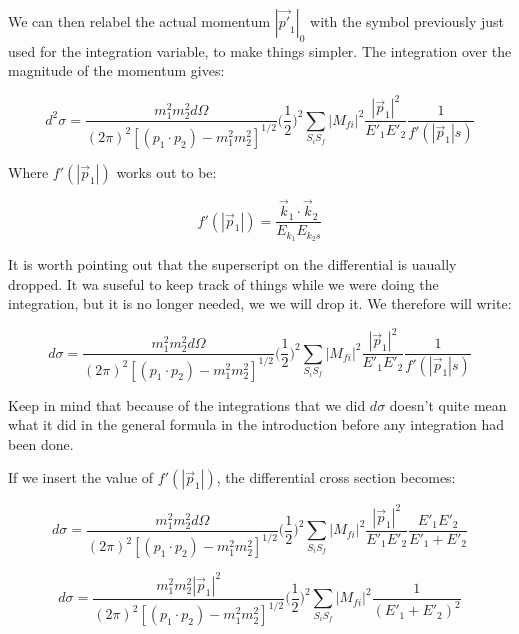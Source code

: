 \documentclass[a4]{article}
\begin{document}
    We can then relabel the actual momentum $|\vec{p'}_1|_0$ with the symbol previously just used for the integration variable, to make things simpler. The integration over the magnitude of the momentum gives: 

    \begin{equation}
        d^2 \sigma = \frac{m_1^2 m_2^2 d \Omega}{(2 \pi)^2 [(p_1 \cdot p_2) - m_1^2 m_2^2]^{1/2}} \bigg( \frac{1}{2} \bigg)^2 \sum_{S_i S_f} |M_{fi}|^2 \frac{|\vec{p}_1|^2}{E'_1 E'_2} \frac{1}{f' (|\vec{p}_1|s)}
    \end{equation}

    Where $f' (|\vec{p}_1|)$ works out to be:

    \begin{equation}
        f' (|\vec{p}_1|) = \frac{\vec{k}_1 \cdot \vec{k}_2}{E_{k_1} E_{k_2s}}
    \end{equation}

    It is worth pointing out that the superscript on the differential is uaually dropped. It wa suseful to keep track of things while we were doing the integration, but it is no longer needed, we we will drop it. 
    We therefore will write: 

    \begin{equation}
        d \sigma = \frac{m_1^2 m_2^2 d \Omega}{(2 \pi)^2 [(p_1 \cdot p_2) - m_1^2 m_2^2]^{1/2}} \bigg( \frac{1}{2} \bigg)^2 \sum_{S_i S_f} |M_{fi}|^2 \frac{|\vec{p}_1|^2}{E'_1 E'_2} \frac{1}{f' (|\vec{p}_1|s)}
    \end{equation}

    Keep in mind that because of the integrations that we did $d \sigma$ doesn't quite mean what it did in the general formula in the introduction before any  integration had been done.

    If we insert the value of $f' (|\vec{p}_1|)$, the differential cross section becomes:

    \begin{equation}
        d \sigma = \frac{m_1^2 m_2^2 d \Omega}{(2 \pi)^2 [(p_1 \cdot p_2) - m_1^2 m_2^2]^{1/2}} \bigg( \frac{1}{2} \bigg)^2 \sum_{S_i S_f} |M_{fi}|^2 \frac{|\vec{p}_1|^2}{E'_1 E'_2} \frac{E'_1 E'_2}{E'_1 + E'_2}
    \end{equation}

    \begin{equation}
        d \sigma = \frac{m_1^2 m_2^2 |\vec{p}_1|^2}{(2 \pi)^2 [(p_1 \cdot p_2) - m_1^2 m_2^2]^{1/2}} \bigg( \frac{1}{2} \bigg)^2 \sum_{S_i S_f} |M_{fi}|^2 \frac{1}{(E'_1 + E'_2)^2}
    \end{equation}
\end{document}
